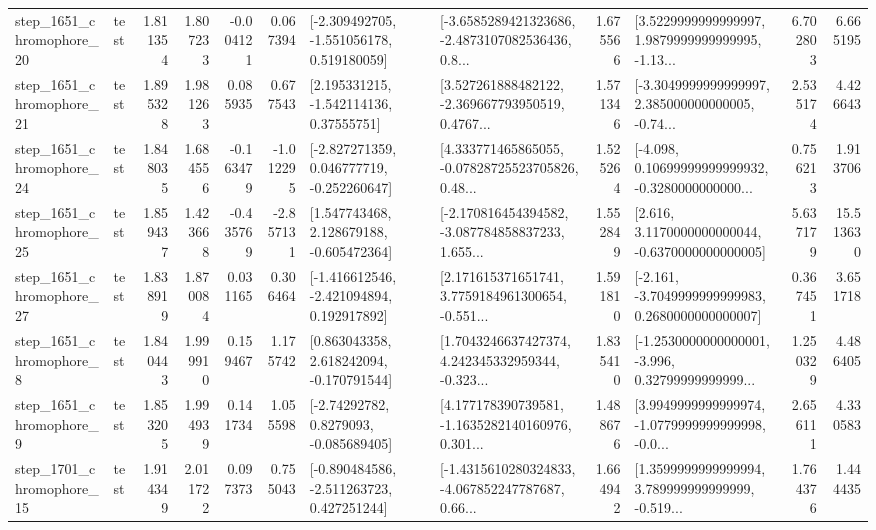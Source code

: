 \begin{tabular}{llrrrrllrlrr}
 step\_1651\_chromophore\_20 &      test &      1.811354 &    1.807233 &     -0.004121 &  0.067394 &   [-2.309492705, -1.551056178, 0.519180059] &  [-3.6585289421323686, -2.4873107082536436, 0.8... &       1.675566 &  [3.5229999999999997, 1.9879999999999995, -1.13... &            6.702803 &          6.665195 \\
 step\_1651\_chromophore\_21 &      test &      1.895328 &    1.981263 &      0.085935 &  0.677543 &     [2.195331215, -1.542114136, 0.37555751] &  [3.527261888482122, -2.369667793950519, 0.4767... &       1.571346 &  [-3.3049999999999997, 2.385000000000005, -0.74... &            2.535174 &          4.426643 \\
 step\_1651\_chromophore\_24 &      test &      1.848035 &    1.684556 &     -0.163479 & -1.012295 &   [-2.827271359, 0.046777719, -0.252260647] &  [4.333771465865055, -0.07828725523705826, 0.48... &       1.525264 &  [-4.098, 0.10699999999999932, -0.3280000000000... &            0.756213 &          1.913706 \\
 step\_1651\_chromophore\_25 &      test &      1.859437 &    1.423668 &     -0.435769 & -2.857131 &    [1.547743468, 2.128679188, -0.605472364] &  [-2.170816454394582, -3.087784858837233, 1.655... &       1.552849 &   [2.616, 3.1170000000000044, -0.6370000000000005] &            5.637179 &         15.513630 \\
 step\_1651\_chromophore\_27 &      test &      1.838919 &    1.870084 &      0.031165 &  0.306464 &   [-1.416612546, -2.421094894, 0.192917892] &  [2.171615371651741, 3.7759184961300654, -0.551... &       1.591810 &  [-2.161, -3.7049999999999983, 0.2680000000000007] &            0.367451 &          3.651718 \\
  step\_1651\_chromophore\_8 &      test &      1.840443 &    1.999910 &      0.159467 &  1.175742 &    [0.863043358, 2.618242094, -0.170791544] &  [1.7043246637427374, 4.242345332959344, -0.323... &       1.835410 &  [-1.2530000000000001, -3.996, 0.32799999999999... &            1.250329 &          4.486405 \\
  step\_1651\_chromophore\_9 &      test &      1.853205 &    1.994939 &      0.141734 &  1.055598 &      [-2.74292782, 0.8279093, -0.085689405] &  [4.177178390739581, -1.1635282140160976, 0.301... &       1.488676 &  [3.9949999999999974, -1.0779999999999998, -0.0... &            2.656111 &          4.330583 \\
 step\_1701\_chromophore\_15 &      test &      1.914349 &    2.011722 &      0.097373 &  0.755043 &   [-0.890484586, -2.511263723, 0.427251244] &  [-1.4315610280324833, -4.067852247787687, 0.66... &       1.664942 &  [1.3599999999999994, 3.789999999999999, -0.519... &            1.764376 &          1.444435 \\

\end{tabular}
